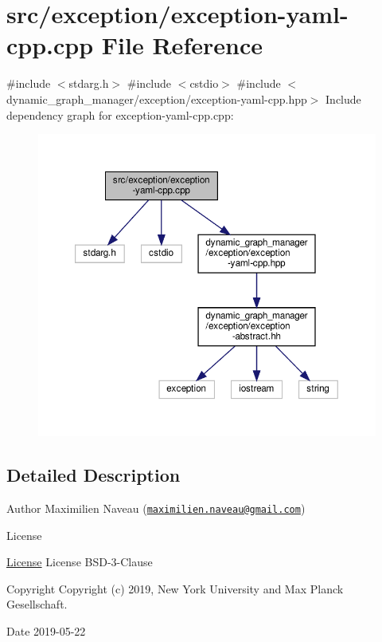 \hypertarget{exception-yaml-cpp_8cpp}{}\section{src/exception/exception-\/yaml-\/cpp.cpp File Reference}
\label{exception-yaml-cpp_8cpp}
{\ttfamily \#include $<$stdarg.\+h$>$}\newline
{\ttfamily \#include $<$cstdio$>$}\newline
{\ttfamily \#include $<$dynamic\+\_\+graph\+\_\+manager/exception/exception-\/yaml-\/cpp.\+hpp$>$}\newline
Include dependency graph for exception-\/yaml-\/cpp.cpp\+:
\nopagebreak
\begin{figure}[H]
\begin{center}
\leavevmode
\includegraphics[width=350pt]{exception-yaml-cpp_8cpp__incl}
\end{center}
\end{figure}


\subsection{Detailed Description}
\begin{DoxyAuthor}{Author}
Maximilien Naveau (\href{mailto:maximilien.naveau@gmail.com}{\tt maximilien.\+naveau@gmail.\+com}) 
\end{DoxyAuthor}
\begin{DoxyRefDesc}{License}
\item[\hyperlink{license__license000051}{License}]License B\+S\+D-\/3-\/\+Clause \end{DoxyRefDesc}
\begin{DoxyCopyright}{Copyright}
Copyright (c) 2019, New York University and Max Planck Gesellschaft. 
\end{DoxyCopyright}
\begin{DoxyDate}{Date}
2019-\/05-\/22 
\end{DoxyDate}
